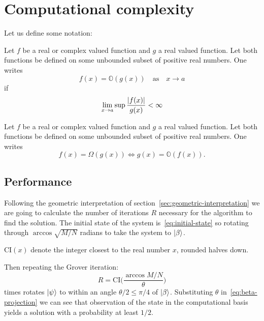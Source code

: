 \section{Computational complexity}
Let us define some notation:
\begin{defn}
   Let $f$ be a real or complex valued function and $g$ a real valued function. Let both functions be defined on some unbounded subset of positive real numbers. One writes
   \begin{equation*}
       f(x) = \mathbb{O}(g(x)) \quad \text{as} \quad x \rightarrow a
   \end{equation*}
   if 
   \begin{equation*}
      \lim_{x \to a} \sup{\frac{\lvert f(x)\rvert}{g(x)}} < \infty
   \end{equation*}
   \end{defn}
   \begin{defn}
      Let $f$ be a real or complex valued function and $g$ a real valued function. Let both functions be defined on some unbounded subset of positive real numbers. One writes
   \begin{equation*}
       f(x) = \Omega(g(x))
    \Longleftrightarrow
      g(x) = \mathbb{O}(f(x)).
   \end{equation*}
   \end{defn}
   

\subsection{Performance}\label{sec:performance}
Following the geometric interpretation of section~\ref{sec:geometric-interpretation} we are going to calculate the number of iterations $R$ necessary for the algorithm to find the solution. The initial state of the system is~\ref{eq:initial-state} so rotating through $\arccos{\sqrt{M/N}}$ radians to take the system to $\ket{\beta}$.
\begin{defn}
$\text{CI}(x)$ denote the integer closest to the real number $x$, rounded halves down.
\end{defn}
Then repeating the Grover iteration:
\begin{equation}\label{eq:R}
    R = \text{CI}\biggl(\frac{\arccos{M/N}}{\theta}\biggr)
\end{equation}
times rotates $\ket{\psi}$ to within an angle $\theta/2 \leq \pi/4$ of $\ket{\beta}$. Substituting $\theta$ in~\ref{eq:beta-projection} we can see that observation of the state in the computational basis yields a solution with a probability at least $1/2$. 

